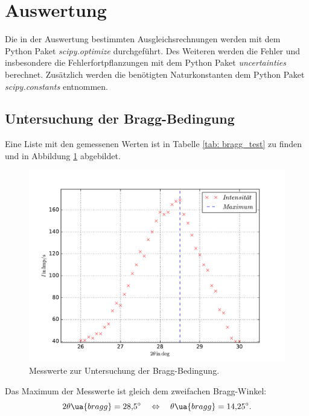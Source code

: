 \section{Auswertung}
Die in der Auswertung bestimmten Ausgleichsrechnungen werden mit
dem Python Paket \emph{scipy.optimize}\cite{scipy} durchgeführt.
Des Weiteren werden die Fehler und insbesondere die Fehlerfortpflanzungen
mit dem Python Paket \emph{uncertainties}\cite{uncertainties} berechnet.
Zusätzlich werden die benötigten Naturkonstanten dem Python Paket \emph{scipy.constants}\cite{scipy}
entnommen.
\FloatBarrier
\subsection{Untersuchung der Bragg-Bedingung}
Eine Liste mit den gemessenen Werten ist in Tabelle \ref{tab: bragg_test} zu finden und in Abbildung \ref{fig: bragg_plot} abgebildet.

\begin{figure}
  \centering
  \includegraphics[width=0.8 \textwidth]{../Messdaten/bragbed.pdf}
  \caption{Messwerte zur Untersuchung der Bragg-Bedingung.}
  \label{fig: bragg_plot}
\end{figure}
Das Maximum der Messwerte ist gleich dem zweifachen Bragg-Winkel:
\begin{equation}
  \label{eq:bestimmt_bragg_winkel}
  2\theta\ua{bragg}=\SI{28.5}{\degree} \quad \Leftrightarrow \quad \theta\ua{bragg}=\SI{14.25}{\degree}.
\end{equation} %
\FloatBarrier

\FloatBarrier
